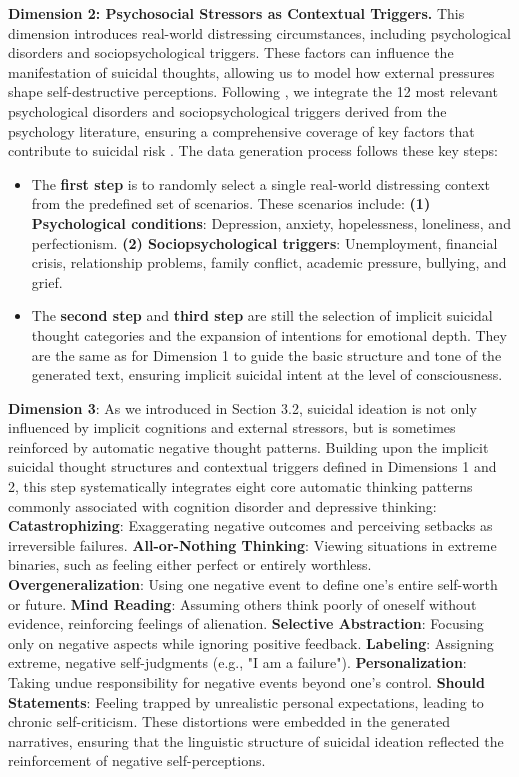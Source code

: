 \noindent \textbf{Dimension 2:  Psychosocial Stressors as Contextual Triggers. }
This dimension introduces real-world distressing circumstances, including psychological disorders and sociopsychological triggers. These factors can influence the manifestation of suicidal thoughts, allowing us to model how external pressures shape self-destructive perceptions.
Following \cite{method14}, we integrate the 12 most relevant psychological disorders and sociopsychological triggers derived from the psychology literature, ensuring a comprehensive coverage of key factors that contribute to suicidal risk . The data generation process follows these key steps: 
\begin{itemize}
    \item The \textbf{first step} is to randomly select a single real-world distressing context from the predefined set of scenarios. These scenarios include: \textbf{ (1) Psychological conditions}: Depression, anxiety, hopelessness, loneliness, and perfectionism.
\textbf{(2) Sociopsychological triggers}: Unemployment, financial crisis, relationship problems, family conflict, academic pressure, bullying, and grief.  
\item The \textbf{second step} and \textbf{third step} are still the selection of implicit suicidal thought categories and the expansion of intentions for emotional depth. They are the same as for Dimension 1 to guide the basic structure and tone of the generated text, ensuring implicit suicidal intent at the level of consciousness. 
\end{itemize}
\noindent \textbf{Dimension 3}: 
As we introduced in Section 3.2, suicidal ideation is not only influenced by implicit cognitions and external stressors, but is sometimes reinforced by automatic negative thought patterns. Building upon the implicit suicidal thought structures and contextual triggers defined in Dimensions 1 and 2, this step systematically integrates  eight core automatic thinking patterns commonly associated with cognition disorder and depressive thinking: \textbf{Catastrophizing}: Exaggerating negative outcomes and perceiving setbacks as irreversible failures. \textbf{All-or-Nothing Thinking}: Viewing situations in extreme binaries, such as feeling either perfect or entirely worthless.
\textbf{Overgeneralization}: Using one negative event to define one’s entire self-worth or future.
\textbf{Mind Reading}: Assuming others think poorly of oneself without evidence, reinforcing feelings of alienation.
\textbf{Selective Abstraction}: Focusing only on negative aspects while ignoring positive feedback.
\textbf{Labeling}: Assigning extreme, negative self-judgments (e.g., "I am a failure").
\textbf{Personalization}: Taking undue responsibility for negative events beyond one’s control.
\textbf{Should Statements}: Feeling trapped by unrealistic personal expectations, leading to chronic self-criticism. 
These distortions were embedded in the generated narratives, ensuring that the linguistic structure of suicidal ideation reflected the reinforcement of negative self-perceptions.  

